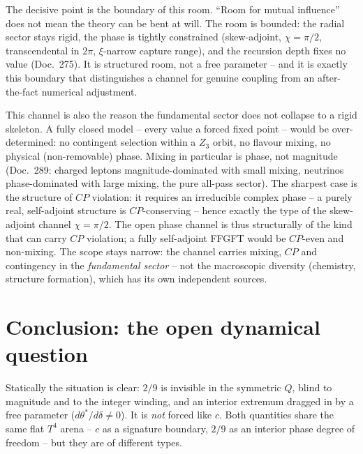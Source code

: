The decisive point is the boundary of this room. \enquote{Room for mutual influence} does not mean
the theory can be bent at will. The room is bounded: the radial sector stays rigid, the phase is
tightly constrained (skew-adjoint, $\chi=\pi/2$, transcendental in $2\pi$, $\xi$-narrow capture
range), and the recursion depth fixes no value (Doc.~275). It is structured room, not a free
parameter -- and it is exactly this boundary that distinguishes a channel for genuine coupling from
an after-the-fact numerical adjustment.

This channel is also the reason the fundamental sector does not collapse to a rigid skeleton. A
fully closed model -- every value a forced fixed point -- would be over-determined: no contingent
selection within a $Z_3$ orbit, no flavour mixing, no physical (non-removable) phase. Mixing in
particular is phase, not magnitude (Doc.~289: charged leptons magnitude-dominated with small
mixing, neutrinos phase-dominated with large mixing, the pure all-pass sector). The sharpest case
is the structure of $CP$ violation: it requires an irreducible complex phase -- a purely real,
self-adjoint structure is $CP$-conserving -- hence exactly the type of the skew-adjoint channel
$\chi=\pi/2$. The open phase channel is thus structurally of the kind that can carry $CP$
violation; a fully self-adjoint FFGFT would be $CP$-even and non-mixing. The scope stays narrow:
the channel carries mixing, $CP$ and contingency in the \emph{fundamental sector} -- not the
macroscopic diversity (chemistry, structure formation), which has its own independent sources.

\section{Conclusion: the open dynamical question}
Statically the situation is clear: $2/9$ is invisible in the symmetric $Q$, blind to magnitude
and to the integer winding, and an interior extremum dragged in by a free parameter
($d\theta^*/d\delta\neq0$). It is \emph{not} forced like $c$. Both quantities share the same
flat $T^4$ arena -- $c$ as a signature boundary, $2/9$ as an interior phase degree of freedom --
but they are of different types.

